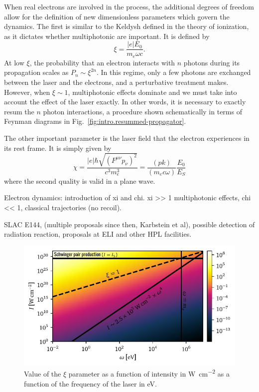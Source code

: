\documentclass[11pt,SymmetricalJury]{inrsthesis/inrsthesis}
\begin{document}
When real electrons are involved in the process, the additional degrees of freedom
allow for the definition of new dimensionless parameters which govern the dynamics.
The first is similar to the Keldysh defined in the theory of ionization, as it
dictates whether multiphotonic are important. It is defined by
  \begin{equation}
    \xi = \frac{|e|E_0}{m_e\omega c}.
  \end{equation}
At low $\xi$, the probability that an electron interacts with $n$ photons
during its propagation scales as $P_n\sim\xi^{2n}$. In this regime,
only a few photons are exchanged between the laser and the electrons, and a
perturbative treatment makes. However, when $\xi\sim1$, multiphotonic effects
dominate and we must take into account the effect of the laser exactly.
In other words, it is necessary to exactly resum the $n$ photon interactions,
a procedure shown schematically in terms of Feynman diagrams in Fig.~\ref{fig:intro.resummed-propagator}.

The other important parameter is the laser field that the electron experiences
in its rest frame. It is simply given by
  \begin{equation}
    \chi = \frac{|e|\hbar\sqrt{\left(F^{\mu\nu}p_\nu\right)^2}}{c^3m_e^3} = \frac{(pk)}{(m_e c\omega)}\frac{E_0}{E_S}
  \end{equation}
where the second quality is valid in a plane wave.

Electron dynamics: introduction of xi and chi. xi >> 1 multiphotonic effects,
chi << 1, classical trajectories (no recoil).

SLAC E144, (multiple proposals since then, Karbstein et al), possible
detection of radiation reaction, proposals at ELI and other HPL facilities.



\begin{figure}
  \centering
  \includegraphics{figs/ClassicalLimit.pdf}
  \caption[Map of non-linearity parameters in intensity-frequency space.]
          {Value of the $\xi$ parameter as a function of intensity in \si{\watt\per\cm\squared}
          as a function of the frequency of the laser in \si{\eV}.}
  \label{fig:intro.xi-map}
\end{figure}
\end{document}

